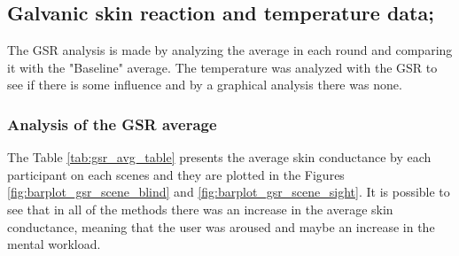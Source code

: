 \subsection{Galvanic skin reaction and temperature data;}
\label{subsec:results_gsr_temp}

The GSR analysis is made by analyzing the average in each round and comparing it with the "Baseline" average. The temperature was analyzed with the GSR to see if there is some influence and by a graphical analysis there was none.

\subsubsection{Analysis of the GSR average}

The Table \ref{tab:gsr_avg_table} presents the average skin conductance by each participant on each scenes and they are plotted in the Figures \ref{fig:barplot_gsr_scene_blind} and \ref{fig:barplot_gsr_scene_sight}. It is possible to see that in all of the methods there was an increase in the average skin conductance, meaning that the user was aroused and maybe an increase in the mental workload.



